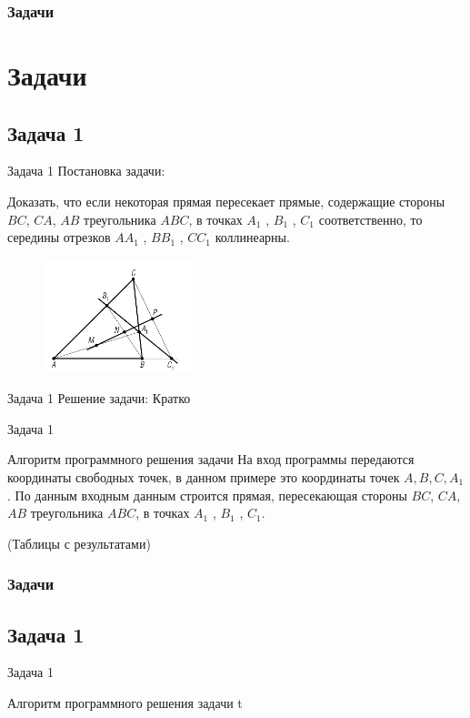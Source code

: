 \documentclass{beamer}
\newcommand\frametitleSpec[1]{%
\frametitle{#1}
\section{#1}%
}
\begin{document}
\begin{frame}
    \frametitleSpec{Задачи}
    \subsection{Задача 1}
    \begin{block}{Задача 1}
        Постановка задачи:

        Доказать, что если некоторая прямая пересекает прямые, содержащие стороны \(BC\), \(CA\), \(AB\) треугольника \(ABC\), в точках \(A_1\) , \(B_1\) , \(C_1\) соответственно, то середины отрезков \(AA_1\) , \(BB_1\) , \(CC_1\) коллинеарны.

        \begin{figure}[h]
            \centering
            \includegraphics[width=0.4\textwidth]{images/task1.png}
            \label{task1}
        \end{figure}
    \end{block}
\end{frame}
\begin{frame}

    \begin{block}{Задача 1}
        Решение задачи:
        Кратко
    \end{block}
\end{frame}
\begin{frame}
    \begin{block}{Задача 1}
        \begin{block}{Алгоритм программного решения задачи}
            На вход программы передаются координаты свободных точек, в данном примере это координаты точек \(A,B,C,A_1\). По данным входным данным строится прямая, пересекающая стороны \(BC\), \(CA\), \(AB\) треугольника \(ABC\), в точках \(A_1\) , \(B_1\) , \(C_1\).
        \end{block}
    \end{block}
\end{frame}
\begin{frame}
    (Таблицы с результатами)
\end{frame}
\begin{frame}
    \frametitle{Задачи}

    \subsection{Задача 1}
    \begin{block}{Задача 1}
        \begin{block}{Алгоритм программного решения задачи}
            t
        \end{block}
    \end{block}

\end{frame}
\end{document}
